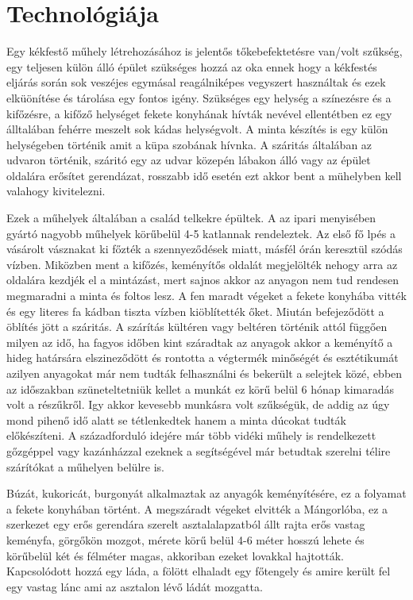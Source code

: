 \documentclass[fontsize=12pt, appendixprefix=true]{scrreprt}
\begin{document}
\section{Technológiája}
Egy kékfestő műhely létrehozásához is jelentős tőkebefektetésre van/volt szűkség, egy teljesen külön álló épület szükséges hozzá az oka ennek hogy a kékfestés eljárás során sok veszéjes egymásal reagálniképes vegyszert használtak és ezek elküönítése és tárolása egy fontos igény. Szükséges egy helység a színezésre és a kifőzésre, a  kifőző helységet fekete konyhának hívták nevével ellentétben ez egy álltalában fehérre meszelt sok kádas helységvolt. A minta készítés is egy külön helységeben történik amit a küpa szobának hívnka. A száritás általában az udvaron történik, száritó egy az udvar közepén lábakon álló vagy az épület oldalára erősítet gerendázat, rosszabb idő esetén ezt akkor bent a mühelyben kell valahogy kivitelezni.

Ezek a műhelyek általában a család telkekre épültek. A az ipari menyisében gyártó nagyobb műhelyek körűbelül 4-5 katlannak rendeleztek. Az első fő lpés a vásárolt vásznakat ki főzték a szennyeződések miatt, másfél órán keresztül szódás vízben. Miközben ment a kifőzés, keményítős oldalát megjelölték nehogy arra az oldalára kezdjék el a mintázást, mert sajnos akkor az anyagon nem tud rendesen megmaradni a minta és foltos lesz. A fen maradt végeket a fekete konyhába vitték és egy literes fa kádban tiszta vízben kiöblítették őket. Miután befejeződött a öblítés jött a száritás. A szárítás kültéren vagy beltéren történik attól függően milyen az idő, ha fagyos időben kint száradtak az anyagok akkor a keményítő a hideg határsára elszineződött és rontotta a végtermék minőségét és esztétikumát azilyen anyagokat már nem tudták felhasználni és bekerült a selejtek közé, ebben az időszakban szüneteltetniük kellet a munkát ez körű belül 6 hónap kimaradás volt a részűkről. Igy akkor kevesebb munkásra volt szűkségük, de addig az úgy mond pihenő idő alatt se tétlenkedtek hanem a minta dúcokat tudták előkészíteni.
A századforduló idejére már több vidéki műhely is rendelkezett gőzgéppel vagy kazánházzal ezeknek a segítségével már betudtak szerelni télire szárítókat a műhelyen belülre is.

Búzát, kukoricát, burgonyát alkalmaztak az anyagók keményítésére, ez a folyamat a fekete konyhában történt. A megszáradt végeket elvitték a Mángorlóba, ez a szerkezet  egy erős gerendára szerelt asztalalapzatból állt rajta erős vastag keményfa, görgőkön mozgot, mérete körű belül 4-6 méter hosszú lehete és körűbelül két és félméter magas, akkoriban ezeket lovakkal hajtották. Kapcsolódott hozzá egy láda, a fölött elhaladt egy főtengely és amire került fel egy vastag lánc ami az asztalon lévő ládát mozgatta.
\end{document}
